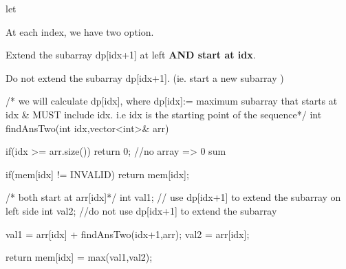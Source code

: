 \begin{solution}
    let 

    At each index, we have two option. 
    \begin{asparaenum}[(a)]
        \item Extend the subarray dp[idx+1] at left \textbf{AND start at idx}.
        \item Do not extend the subarray dp[idx+1]. (ie. start a new subarray )
    \end{asparaenum}

    
    \begin{code}
        /* we will calculate dp[idx], where
        dp[idx]:= maximum subarray that starts at idx & MUST include idx.
        i.e idx is the starting point of the sequence*/
        int findAnsTwo(int idx,vector<int>& arr)
        {
            if(idx >= arr.size()) return 0; //no array => 0 sum
            
            if(mem[idx] != INVALID)
                return mem[idx];
            
            /* both start at arr[idx]*/
            int val1; // use dp[idx+1] to extend the subarray on left side
            int val2; //do not use dp[idx+1] to extend the subarray
            
            val1 = arr[idx] + findAnsTwo(idx+1,arr);
            val2 = arr[idx];
            
            return mem[idx] = max(val1,val2);
        }
    \end{code}
\end{solution}

